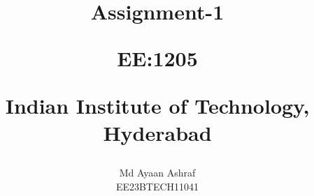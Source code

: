 \documentclass[journal,12pt,twocolumn]{IEEEtran}
\theoremstyle{remark}
\begin{document}
%




\vspace{3cm}

\title{
Assignment-1 

\large{EE:1205 }

Indian Institute of Technology, Hyderabad
}
\author{Md Ayaan Ashraf

EE23BTECH11041
}  


%
%
%
% 
%



% 
\end{document}
